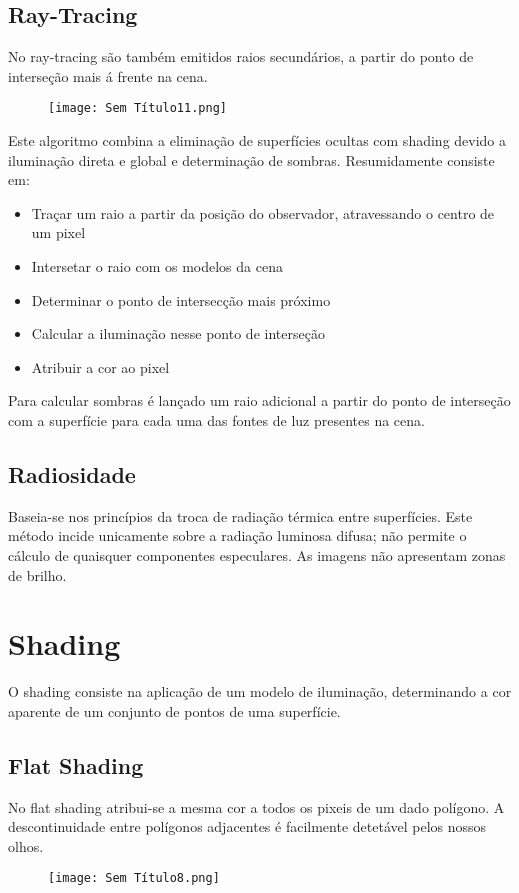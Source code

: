 \documentclass[10pt,a4paper]{report}
\begin{document}
\subsection{Ray-Tracing}
No ray-tracing são também emitidos raios secundários, a partir do ponto de interseção mais á frente na cena.
\begin{figure}[H]
\centering
\texttt{[image: Sem Título11.png]}
\end{figure}
Este algoritmo combina a eliminação de superfícies ocultas com shading devido a iluminação direta e global e determinação de sombras. Resumidamente consiste em:
\begin{itemize}
\item Traçar um raio a partir da posição do observador, atravessando o centro de um pixel
\item Intersetar o raio com os modelos da cena
\item Determinar o ponto de intersecção mais próximo
\item Calcular a iluminação nesse ponto de interseção
\item Atribuir a cor ao pixel
\end{itemize}
Para calcular sombras é lançado um raio adicional a partir do ponto de interseção com a superfície para cada uma das fontes de luz presentes na cena.
\subsection{Radiosidade}
Baseia-se nos princípios da troca de radiação térmica entre superfícies. Este método incide unicamente sobre a radiação luminosa difusa; não permite o cálculo de quaisquer componentes especulares. As imagens não apresentam zonas de brilho.
\section{Shading}
O shading consiste na aplicação de um modelo de iluminação, determinando a cor aparente de um conjunto de pontos de uma superfície. 
\subsection{Flat Shading}
No flat shading atribui-se a mesma cor a todos os pixeis de um dado polígono. A descontinuidade entre polígonos adjacentes é facilmente detetável pelos nossos olhos.
\begin{figure}[H]
\centering
\texttt{[image: Sem Título8.png]}
\end{figure}
\end{document}
